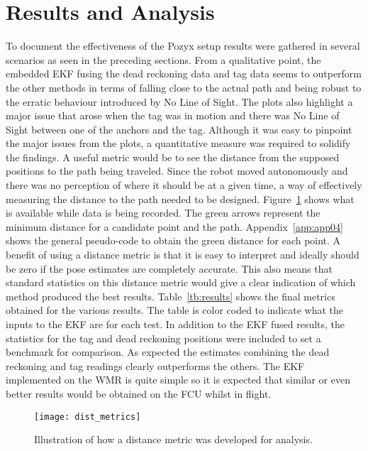 \section{Results and Analysis}\label{ch:results-and-analysis}
To document the effectiveness of the Pozyx setup results were gathered in several scenarios as seen in the preceding sections.
From a qualitative point, the embedded EKF fusing the dead reckoning data and tag data seems to outperform the other methods in terms of falling close to the actual path and being robust to the erratic behaviour introduced by No Line of Sight.
The plots also highlight a major issue that arose when the tag was in motion and there was No Line of Sight between one of the anchors and the tag.
Although it was easy to pinpoint the major issues from the plots, a quantitative measure was required to solidify the findings.
A useful metric would be to see the distance from the supposed positions to the path being traveled.
Since the robot moved autonomously and there was no perception of where it should be at a given time, a way of effectively measuring the distance to the path needed to be designed.
Figure~\ref{fig:dist} shows what is available while data is being recorded.
The green arrows represent the minimum distance for a candidate point and the path.
Appendix~\ref{app:app04} shows the general pseudo-code to obtain the green distance for each point.
A benefit of using a distance metric is that it is easy to interpret and ideally should be zero if the pose estimates are completely accurate.
This also means that standard statistics on this distance metric would give a clear indication of which method produced the best results.
Table~\ref{tb:results} shows the final metrics obtained for the various results.
The table is color coded to indicate what the inputs to the EKF are for each test.
In addition to the EKF fused results, the statistics for the tag and dead reckoning positions were included to set a benchmark for comparison.
As expected the estimates combining the dead reckoning and tag readings clearly outperforms the others.
The EKF implemented on the WMR is quite simple so it is expected that similar or even better results would be obtained on the FCU whilst in flight.

\begin{figure}[h!]
    \centering
    \texttt{[image: dist\_metrics]}
    \caption{Illustration of how a distance metric was developed for analysis.}
    \label{fig:dist}
\end{figure}


